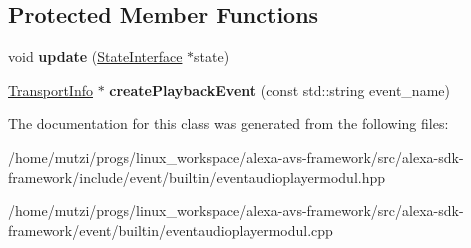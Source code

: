 \subsection*{Protected Member Functions}
\begin{DoxyCompactItemize}
\item 
\mbox{\label{classAlexaEvent_1_1EventAudioPlayerModul_a95ea5ffcfca51b2645f52e69bd98f8fa}} 
void {\bfseries update} (\hyperlink{classAlexaEvent_1_1StateInterface}{State\+Interface} $\ast$state)
\item 
\mbox{\label{classAlexaEvent_1_1EventAudioPlayerModul_a7ae965342853f076acea1f95e82cf588}} 
\hyperlink{classAlexaEvent_1_1TransportInfo}{Transport\+Info} $\ast$ {\bfseries create\+Playback\+Event} (const std\+::string event\+\_\+name)
\end{DoxyCompactItemize}


The documentation for this class was generated from the following files\+:\begin{DoxyCompactItemize}
\item 
/home/mutzi/progs/linux\+\_\+workspace/alexa-\/avs-\/framework/src/alexa-\/sdk-\/framework/include/event/builtin/eventaudioplayermodul.\+hpp\item 
/home/mutzi/progs/linux\+\_\+workspace/alexa-\/avs-\/framework/src/alexa-\/sdk-\/framework/event/builtin/eventaudioplayermodul.\+cpp\end{DoxyCompactItemize}
